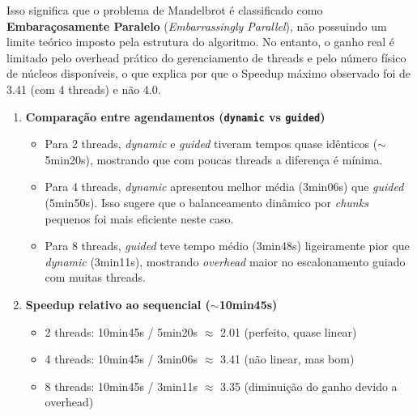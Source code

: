 \documentclass[12pt]{article}
\begin{document}
Isso significa que o problema de Mandelbrot é classificado como \textbf{Embaraçosamente Paralelo} (\textit{Embarrassingly Parallel}), não possuindo um limite teórico imposto pela estrutura do algoritmo. No entanto, o ganho real é limitado pelo overhead prático do gerenciamento de threads e pelo número físico de núcleos disponíveis, o que explica por que o Speedup máximo observado foi de 3.41 (com 4 threads) e não 4.0.

\begin{enumerate}

    \item \textbf{Comparação entre agendamentos (\texttt{dynamic} vs \texttt{guided})}
    \vspace{0.5em} %
    \begin{itemize}
        \item Para 2 threads, \textit{dynamic} e \textit{guided} tiveram tempos quase idênticos ($\sim$5min20s), mostrando que com poucas threads a diferença é mínima.
        \item Para 4 threads, \textit{dynamic} apresentou melhor média (3min06s) que \textit{guided} (5min50s). Isso sugere que o balanceamento dinâmico por \textit{chunks} pequenos foi mais eficiente neste caso.
        \item Para 8 threads, \textit{guided} teve tempo médio (3min48s) ligeiramente pior que \textit{dynamic} (3min11s), mostrando \textit{overhead} maior no escalonamento guiado com muitas threads.
    \end{itemize}
    \vspace{0.5em} %

    \item \textbf{Speedup relativo ao sequencial ($\sim$10min45s)}
    \vspace{0.5em} %
    \begin{itemize}
        \item 2 threads: 10min45s / 5min20s $\approx$ 2.01 (perfeito, quase linear)
        \item 4 threads: 10min45s / 3min06s $\approx$ 3.41 (não linear, mas bom)
        \item 8 threads: 10min45s / 3min11s $\approx$ 3.35 (diminuição do ganho devido a overhead)
    \end{itemize}

\end{enumerate}
\end{document}
